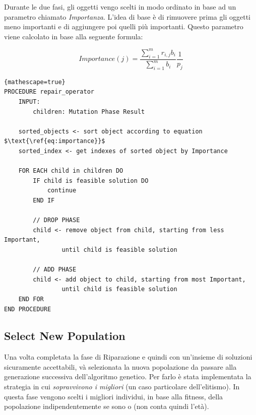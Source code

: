 Durante le due fasi, gli oggetti vengo scelti in modo ordinato in base ad un
parametro chiamato \textit{Importanza}. L'idea di base è di rimuovere prima gli
oggetti meno importanti e di aggiungere poi quelli più importanti. Questo parametro
viene calcolato in base alla seguente formula:

\begin{equation}\label{eq:importance}
    Importance(j) = \frac{\sum_{i=1}^{m} r_{i,j} b_i}{\sum_{i=1}^{m} b_i} \frac{1}{p_j}
\end{equation}

\begin{minipage}{\textwidth}
    \begin{lstlisting}{mathescape=true}
PROCEDURE repair_operator
    INPUT:
        children: Mutation Phase Result

    sorted_objects <- sort object according to equation $\text{\ref{eq:importance}}$
    sorted_index <- get indexes of sorted object by Importance

    FOR EACH child in children DO
        IF child is feasible solution DO
            continue
        END IF

        // DROP PHASE
        child <- remove object from child, starting from less Important,
                until child is feasible solution

        // ADD PHASE
        child <- add object to child, starting from most Important,
                until child is feasible solution
    END FOR
END PROCEDURE
    \end{lstlisting}
\end{minipage}

\subsection{Select New Population}

Una volta completata la fase di Riparazione e quindi con un'insieme di soluzioni
sicuramente accettabili, và selezionata la nuova popolazione da passare alla
generazione successiva dell'algoritmo genetico. Per farlo è stata implementata
la strategia in cui \textit{sopravvivono i migliori} (un caso particolare
dell'elitismo). In questa fase vengono scelti i migliori individui, in base alla
fitness, della popolazione indipendentemente se sono  o
 (non conta quindi l'età).

